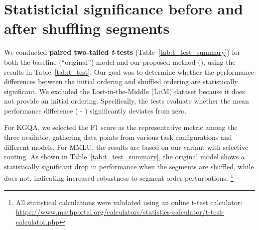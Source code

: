 \section{Statisticial significance before and after shuffling segments}
\label{appendix:statistical_significance}

We conducted \textbf{paired two-tailed \textit{t}-tests} (Table~\ref{tab:t_test_summary}) for both the baseline (``original'') model and our proposed method (\ours{}), using the results in Table~\ref{tab:t_test}. Our goal was to determine whether the performance differences between the initial ordering and shuffled ordering are statistically significant. We excluded the Lost-in-the-Middle (LitM) dataset because it does not provide an initial ordering. Specifically, the tests evaluate whether the mean performance difference ( - ) significantly deviates from zero.

For KGQA, we selected the F1 score as the representative metric among the three available, gathering data points from various task configurations and different models. For MMLU, the results are based on our \ours{} variant with selective routing. As shown in Table~\ref{tab:t_test_summary}, the original model shows a statistically significant drop in performance when the segments are shuffled, while \ours{} does not, indicating increased robustness to segment-order perturbations. \footnote{All statistical calculations were validated using an online t-test calculator: \url{https://www.mathportal.org/calculators/statistics-calculator/t-test-calculator.php}}

